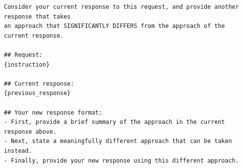 \documentclass[10pt]{article} %
\begin{document}
\begin{promptbox}[title=Self-diverge prompt, colbacktitle=MediumOrchid!90!black, colframe=MediumOrchid!90!black,
colback=gray!5]
\small
\begin{verbatim}
Consider your current response to this request, and provide another response that takes 
an approach that SIGNIFICANTLY DIFFERS from the approach of the current response.

## Request:
{instruction}

## Current response:
{previous_response}

## Your new response format:
- First, provide a brief summary of the approach in the current response above.
- Next, state a meaningfully different approach that can be taken instead.
- Finally, provide your new response using this different approach.
\end{verbatim}
\end{promptbox}
\end{document}
